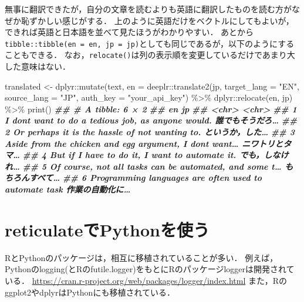 \documentclass[
]{article}
\newenvironment{Shaded}{\begin{snugshade}}{\end{snugshade}}
\newcommand{\AttributeTok}[1]{\textcolor[rgb]{0.77,0.63,0.00}{#1}}
\newcommand{\DocumentationTok}[1]{\textcolor[rgb]{0.56,0.35,0.01}{\textbf{\textit{#1}}}}
\newcommand{\FunctionTok}[1]{\textcolor[rgb]{0.00,0.00,0.00}{#1}}
\newcommand{\NormalTok}[1]{#1}
\newcommand{\OtherTok}[1]{\textcolor[rgb]{0.56,0.35,0.01}{#1}}
\newcommand{\SpecialCharTok}[1]{\textcolor[rgb]{0.00,0.00,0.00}{#1}}
\newcommand{\StringTok}[1]{\textcolor[rgb]{0.31,0.60,0.02}{#1}}
\begin{document}
無事に翻訳できたが，自分の文章を読むよりも英語に翻訳したものを読む方がなぜか恥ずかしい感じがする．
上のように英語だけをベクトルにしてもよいが，できれば英語と日本語を並べて見たほうがわかりやすい．
あとから\texttt{tibble::tibble(en\ =\ en,\ jp\ =\ jp)}としても同じであるが，以下のようにすることもできる．
なお，\texttt{relocate()}は列の表示順を変更しているだけであまり大した意味はない．

\begin{Shaded}
\begin{Highlighting}[]
\NormalTok{translated }\OtherTok{\textless{}{-}} 
\NormalTok{  dplyr}\SpecialCharTok{::}\FunctionTok{mutate}\NormalTok{(text, }\AttributeTok{en =}\NormalTok{ deeplr}\SpecialCharTok{::}\FunctionTok{translate2}\NormalTok{(jp, }
    \AttributeTok{target\_lang =} \StringTok{"EN"}\NormalTok{, }\AttributeTok{source\_lang =} \StringTok{"JP"}\NormalTok{, }\AttributeTok{auth\_key =} \StringTok{"your\_api\_key"}\NormalTok{) }\SpecialCharTok{\%\textgreater{}\%}
\NormalTok{  dplyr}\SpecialCharTok{::}\FunctionTok{relocate}\NormalTok{(en, jp) }\SpecialCharTok{\%\textgreater{}\%}
  \FunctionTok{print}\NormalTok{()}
\DocumentationTok{\#\# \# A tibble: 6 × 2}
\DocumentationTok{\#\#   en                                                       jp}
\DocumentationTok{\#\#   \textless{}chr\textgreater{}                                                    \textless{}chr\textgreater{}}
\DocumentationTok{\#\# 1 I don\textquotesingle{}t want to do a tedious job, as anyone would.       誰でもそうだろ…}
\DocumentationTok{\#\# 2 Or perhaps it is the hassle of not wanting to.           というか，した…}
\DocumentationTok{\#\# 3 Aside from the chicken and egg argument, I don\textquotesingle{}t want…  ニワトリとタマ…}
\DocumentationTok{\#\# 4 But if I have to do it, I want to automate it.           でも，しなけれ…}
\DocumentationTok{\#\# 5 Of course, not all tasks can be automated, and some t…  もちろんすべて…}
\DocumentationTok{\#\# 6 Programming languages are often used to automate task    作業の自動化に…}
\end{Highlighting}
\end{Shaded}

\hypertarget{reticulate}{%
\section{reticulateでPythonを使う}\label{reticulate}}

RとPythonのパッケージは，相互に移植されていることが多い．
例えば，Pythonのlogging(とRのfutile.logger)をもとにRのパッケージloggerは開発されている．
\url{https://cran.r-project.org/web/packages/logger/index.html}
また，Rのggplot2やdplyrはPythonにも移植されている．
\end{document}
